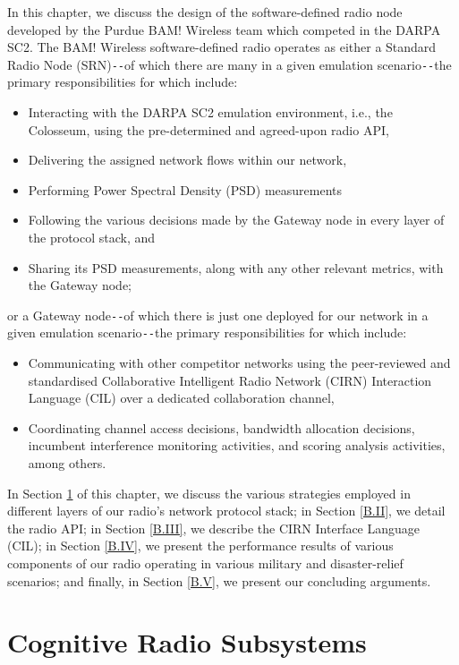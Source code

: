 In this chapter, we discuss the design of the software-defined radio node developed by the Purdue BAM! Wireless team which competed in the DARPA SC2. The BAM! Wireless software-defined radio operates as either a Standard Radio Node (SRN)\texttt{-{}-}of which there are many in a given emulation scenario\texttt{-{}-}the primary responsibilities for which include:
\begin{itemize}
    \item Interacting with the DARPA SC2 emulation environment, i.e., the Colosseum, using the pre-determined and agreed-upon radio API,
    \item Delivering the assigned network flows within our network,
    \item Performing Power Spectral Density (PSD) measurements
    \item Following the various decisions made by the Gateway node in every layer of the protocol stack, and
    \item Sharing its PSD measurements, along with any other relevant metrics, with the Gateway node;
\end{itemize}
or a Gateway node\texttt{-{}-}of which there is just one deployed for our network in a given emulation scenario\texttt{-{}-}the primary responsibilities for which include:
\begin{itemize}
    \item Communicating with other competitor networks using the peer-reviewed and standardised Collaborative Intelligent Radio Network (CIRN) Interaction Language (CIL) over a dedicated collaboration channel,
    \item Coordinating channel access decisions, bandwidth allocation decisions, incumbent interference monitoring activities, and scoring analysis activities, among others.
\end{itemize}
In Section \ref{B.I} of this chapter, we discuss the various strategies employed in different layers of our radio's network protocol stack; in Section \ref{B.II}, we detail the radio API; in Section \ref{B.III}, we describe the CIRN Interface Language (CIL); in Section \ref{B.IV}, we present the performance results of various components of our radio operating in various military and disaster-relief scenarios; and finally, in Section \ref{B.V}, we present our concluding arguments.
\section{Cognitive Radio Subsystems}\label{B.I}
